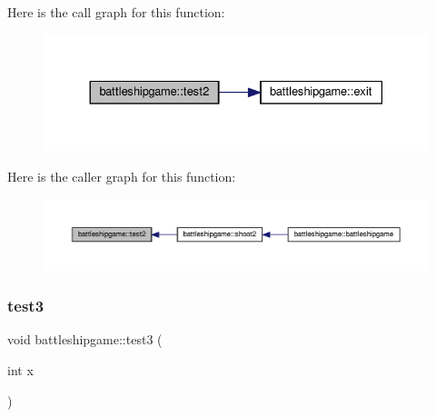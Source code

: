 Here is the call graph for this function\+:
\nopagebreak
\begin{figure}[H]
\begin{center}
\leavevmode
\includegraphics[width=330pt]{classbattleshipgame_a1f6ca1a66e975c0e9785278a2e6d92b9_cgraph}
\end{center}
\end{figure}
Here is the caller graph for this function\+:
\nopagebreak
\begin{figure}[H]
\begin{center}
\leavevmode
\includegraphics[width=350pt]{classbattleshipgame_a1f6ca1a66e975c0e9785278a2e6d92b9_icgraph}
\end{center}
\end{figure}
\mbox{\label{classbattleshipgame_a58028520908b9161db6158aa3478f00c}} 
\subsubsection{\texorpdfstring{test3}{test3}}
{\footnotesize\ttfamily void battleshipgame\+::test3 (\begin{DoxyParamCaption}\item[{int}]{x }\end{DoxyParamCaption})\hspace{0.3cm}{\ttfamily [slot]}}

